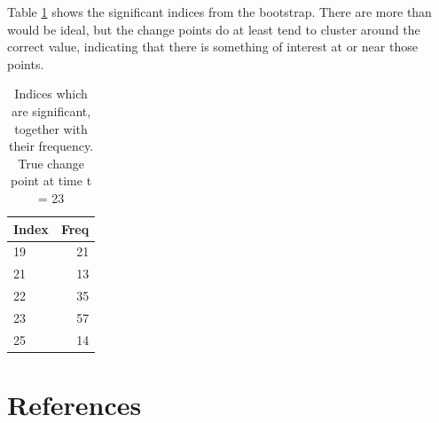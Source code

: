 \documentclass[smallextended]{svjour3}       %
\begin{document}
\begin{example}
Table \ref{tab:chunk_12} shows the significant indices from the bootstrap. There are more than would be ideal, but the change points do at least tend to cluster around the correct value, indicating that there is something of interest at or near those points.

\begin{longtable}[t]{lr}
\caption{\label{tab:chunk_12}Indices which are significant, together with their frequency. True change point at time t = 23}\\
\toprule
Index & Freq\\
\midrule
19 & 21\\
21 & 13\\
22 & 35\\
23 & 57\\
25 & 14\\
\bottomrule
\end{longtable}
\end{example}

\section{References}\label{references}



\end{document}
